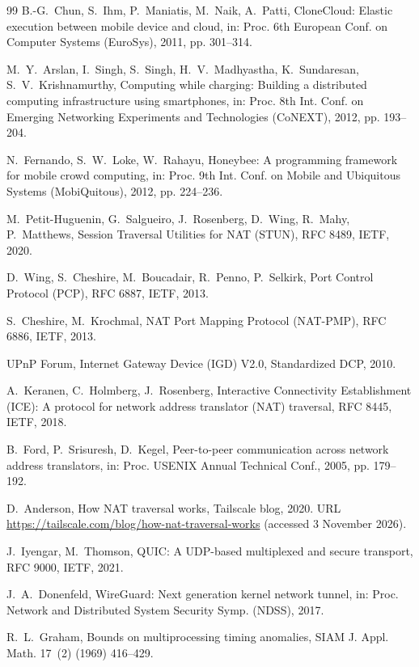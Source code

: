 \documentclass[5p,times,twocolumn]{elsarticle}
\begin{document}
\begin{thebibliography}{99}
 B.-G.~Chun, S.~Ihm, P.~Maniatis, M.~Naik, A.~Patti, CloneCloud: Elastic execution between mobile device and cloud, in: Proc. 6th European Conf. on Computer Systems (EuroSys), 2011, pp. 301--314.

 M.~Y.~Arslan, I.~Singh, S.~Singh, H.~V.~Madhyastha, K.~Sundaresan, S.~V.~Krishnamurthy, Computing while charging: Building a distributed computing infrastructure using smartphones, in: Proc. 8th Int. Conf. on Emerging Networking Experiments and Technologies (CoNEXT), 2012, pp. 193--204.

 N.~Fernando, S.~W.~Loke, W.~Rahayu, Honeybee: A programming framework for mobile crowd computing, in: Proc. 9th Int. Conf. on Mobile and Ubiquitous Systems (MobiQuitous), 2012, pp. 224--236.

 M.~Petit-Huguenin, G.~Salgueiro, J.~Rosenberg, D.~Wing, R.~Mahy, P.~Matthews, Session Traversal Utilities for NAT (STUN), RFC 8489, IETF, 2020.

 D.~Wing, S.~Cheshire, M.~Boucadair, R.~Penno, P.~Selkirk, Port Control Protocol (PCP), RFC 6887, IETF, 2013.

 S.~Cheshire, M.~Krochmal, NAT Port Mapping Protocol (NAT-PMP), RFC 6886, IETF, 2013.

 UPnP Forum, Internet Gateway Device (IGD) V2.0, Standardized DCP, 2010.

 A.~Keranen, C.~Holmberg, J.~Rosenberg, Interactive Connectivity Establishment (ICE): A protocol for network address translator (NAT) traversal, RFC 8445, IETF, 2018.

 B.~Ford, P.~Srisuresh, D.~Kegel, Peer-to-peer communication across network address translators, in: Proc. USENIX Annual Technical Conf., 2005, pp. 179--192.

 D.~Anderson, How NAT traversal works, Tailscale blog, 2020. URL \url{https://tailscale.com/blog/how-nat-traversal-works} (accessed 3 November 2026).

 J.~Iyengar, M.~Thomson, QUIC: A UDP-based multiplexed and secure transport, RFC 9000, IETF, 2021.

 J.~A.~Donenfeld, WireGuard: Next generation kernel network tunnel, in: Proc. Network and Distributed System Security Symp. (NDSS), 2017.

 R.~L.~Graham, Bounds on multiprocessing timing anomalies, SIAM J. Appl. Math. 17~(2) (1969) 416--429.


\end{thebibliography}
\end{document}
